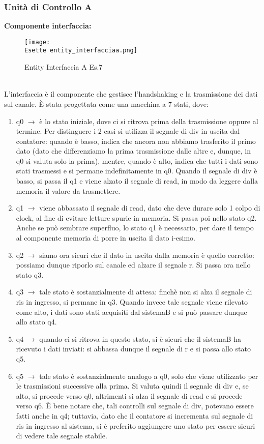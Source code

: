 \documentclass[12pt]{article}
\def \Esette {Allegati/Esercizio7/}
\begin{document}
\subsubsection{Unità di Controllo A}
{\large \textbf{Componente interfaccia:}}
\begin{figure}[ht!]
    \centering
    \texttt{[image: \\Esette entity\_interfacciaa.png]}
    \caption{Entity Interfaccia A Es.7}
\end{figure}
\\L’interfaccia è il componente che gestisce l’handshaking e la trasmissione dei dati sul canale. È stata progettata come una macchina a 7 stati, dove:
\begin{enumerate}
    \item q0 $\rightarrow$ è lo stato iniziale, dove ci si ritrova prima della trasmissione oppure al termine. Per distinguere i 2 casi si utilizza il segnale di div in uscita dal contatore: quando è basso, indica che ancora non abbiamo trasferito il primo dato (dato che differenziamo la prima trasmissione dalle altre e, dunque, in q0 si valuta solo la prima), mentre, quando è alto, indica che tutti i dati sono stati trasmessi e si permane indefinitamente in q0.
          Quando il segnale di div è basso, si passa il q1 e viene alzato il segnale di read, in modo da leggere dalla memoria il valore da trasmettere.
    \item q1 $\rightarrow$ viene abbassato il segnale di read, dato che deve durare solo 1 colpo di clock, al fine di evitare letture spurie in memoria. Si passa poi nello stato q2.
          Anche se può sembrare superfluo, lo stato q1 è necessario, per dare il tempo al componente memoria di porre in uscita il dato i-esimo.
    \item q2 $\rightarrow$ siamo ora sicuri che il dato in uscita dalla memoria è quello corretto: possiamo dunque riporlo sul canale ed alzare il segnale r. Si passa ora nello stato q3.
    \item q3 $\rightarrow$ tale stato è sostanzialmente di attesa: finchè non si alza il segnale di ris in ingresso, si permane in q3. Quando invece tale segnale viene rilevato come alto, i dati sono stati acquisiti dal sistemaB e si può passare dunque allo stato q4.
    \item q4 $\rightarrow$ quando ci si ritrova in questo stato, si è sicuri che il sistemaB ha ricevuto i dati inviati: si abbassa dunque il segnale di r e si passa allo stato q5.
    \item q5 $\rightarrow$ tale stato è sostanzialmente analogo a q0, solo che viene utilizzato per le trasmissioni successive alla prima. Si valuta quindi il segnale di div e, se alto, si procede verso q0, altrimenti si alza il segnale di read e si procede verso q6. È bene notare che, tali controlli sul segnale di div, potevano essere fatti anche in q4; tuttavia, dato che il contatore si incrementa sul segnale di ris in ingresso al sistema, si è preferito aggiungere uno stato per essere sicuri di vedere tale segnale stabile.

\end{enumerate}
\end{document}
